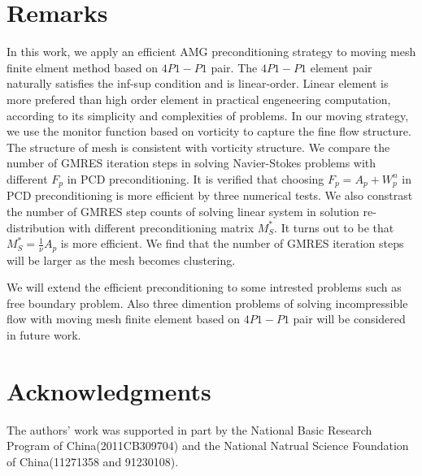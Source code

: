 \documentclass{eajam}
\begin{document}
\section{Remarks}
   \label{sec6} In this work, we apply an efficient AMG
   preconditioning strategy to moving mesh finite elment method based
   on $4P1-P1$ pair. The $4P1-P1$ element pair naturally satisfies the
   inf-sup condition and is linear-order. 
   Linear element is more prefered than high order element in
   practical engeneering computation, according to its simplicity and
   complexities of problems. In our moving strategy, we use the
   monitor function based on vorticity to capture the fine flow
   structure. The structure of mesh is consistent with vorticity
   structure. We compare the number of GMRES iteration steps in
   solving Navier-Stokes problems with different $F_p$ in PCD
   preconditioning. It is verified that choosing $F_p = A_p + W_p^n$
   in PCD preconditioning is more efficient by three numerical tests.
   We also constrast the number of GMRES step counts of solving linear 
   system in solution re-distribution with different preconditioning 
   matrix $M_S^*$. It turns out to be that $M_S^* = \frac{1}{\nu}A_p$
   is more efficient. We find that the number of GMRES iteration steps will
   be larger as the mesh becomes clustering. 
   
   We will extend the efficient preconditioning to some intrested 
   problems such as free boundary problem. Also three dimention
   problems of solving incompressible flow with moving mesh finite
   element based on $4P1-P1$ pair will be considered in future work. 

\section*{Acknowledgments}
The authors' work was supported in part by the National Basic Research
Program of China(2011CB309704) and the National Natrual Science
Foundation of China(11271358 and 91230108).
   


\end{document}
